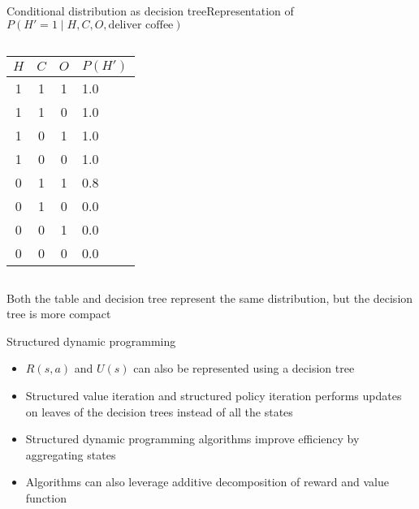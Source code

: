 \documentclass[handout]{dmu}
\begin{document}
\begin{frame}{Conditional distribution as decision tree}{Representation of $P(H' = 1 \mid H, C, O, \text{deliver coffee})$}
\begin{columns}
\begin{column}{4cm}
\begin{tabular}{ccc|l}
$H$ & $C$ & $O$ & $P(H')$ \\ \midrule
1&1&1&1.0\\
1&1&0&1.0\\
1&0&1&1.0\\
1&0&0&1.0\\
0&1&1&0.8\\
0&1&0&0.0\\
0&0&1&0.0\\
0&0&0&0.0
\end{tabular}
\end{column}
\begin{column}{4cm}
\end{column}
\end{columns}
\vfill
Both the table and decision tree represent the same distribution, but the decision tree is more compact
\end{frame}

\begin{frame}{Structured dynamic programming}
\begin{itemize}
\item<1-> $R(s, a)$ and $U(s)$ can also be represented using a decision tree
\item <2-> \alert<2>{Structured value iteration} and \alert<2>{structured policy iteration} performs updates on leaves of the decision trees instead of all the states
\item <3-> Structured dynamic programming algorithms improve efficiency by \alert<3>{aggregating} states
\item <4-> Algorithms can also leverage additive decomposition of reward and value function
\end{itemize}
\end{frame}
\end{document}
